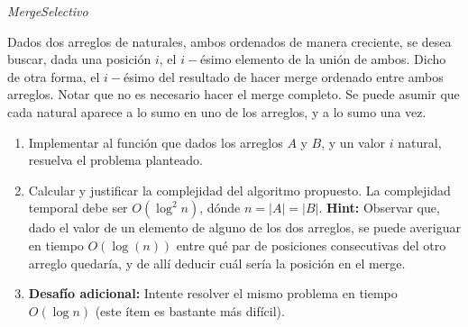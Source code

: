 \def\iesimoMerge{\green{\textit{iésimoMerge}}\xspace}
\begin{enunciado}{\ejercicio[MergeSelectivo]}
  \textit{MergeSelectivo}

  Dados dos arreglos de naturales, ambos ordenados de manera creciente, se desea buscar, dada una posición $i$,
  el $i-$ésimo elemento de la unión de ambos. Dicho de otra forma, el $i-$ésimo del resultado de hacer merge ordenado
  entre ambos arreglos. Notar que no es necesario hacer el merge completo. Se puede asumir que cada natural
  aparece a lo sumo en uno de los arreglos, y a lo sumo una vez.
  \begin{enumerate}[label=\arabic*)]
    \item Implementar al función \iesimoMerge que dados los arreglos $A$ y $B$, y un valor $i$ natural, resuelva
          el problema planteado.

    \item Calcular y justificar la complejidad del algoritmo propuesto. La complejidad temporal debe ser $O(\log^2n)$,
          dónde $n = |A| = |B|$. \textbf{Hint:} Observar que, dado el valor de un elemento de alguno de los dos arreglos, se puede
          averiguar en tiempo $O(\log(n))$ entre qué par de posiciones consecutivas del otro arreglo quedaría, y de allí deducir
          cuál sería la posición en el merge.

    \item \textbf{Desafío adicional:} Intente resolver el mismo problema en tiempo $O(\log n)$ (este ítem es bastante más
          difícil).
  \end{enumerate}
\end{enunciado}


